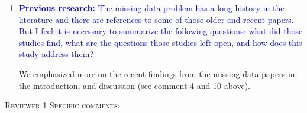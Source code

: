 \documentclass[12pt,letterpaper]{article}
\renewcommand{\section}[1]{%
\bigskip
\begin{center}
\begin{Large}
\normalfont\scshape #1
\medskip
\end{Large}
\end{center}}
\begin{document}
\begin{enumerate}

\item{\textcolor{blue}{\textbf{Previous research:} The missing-data problem has a long history in the literature and there are references to some of those older and recent papers.
But I feel it is necessary to summarize the following questions: what did those studies find, what are the questions those studies left open, and how does this study address them?}}

We emphasized more on the recent findings from the missing-data papers in the introduction, and discussion (see comment 4 and 10 above).

\end{enumerate}

\section{Reviewer 1 Specific comments:}
\end{document}
